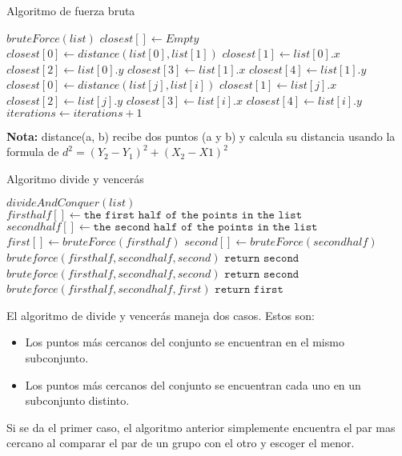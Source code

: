 \begin{algorithm}[h!]
\caption{Algoritmo de fuerza bruta}
\begin{algorithmic}
\State $bruteForce(list)$
    \State $closest[] \gets Empty$
    \State $closest[0] \gets distance(list[0], list[1])$
    \State $closest[1] \gets list[0].x$
    \State $closest[2] \gets list[0].y$
    \State $closest[3] \gets list[1].x$
    \State $closest[4] \gets list[1].y$
            \State $closest[0] \gets distance(list[j], list[i])$
            \State $ closest[1] \gets list[j].x$
            \State $ closest[2] \gets list[j].y$
            \State $ closest[3] \gets list[i].x$
            \State $ closest[4] \gets list[i].y$
        \EndIf
        \EndFor
        \State $ iterations \gets iterations + 1$
    \EndFor
\end{algorithmic}    
\end{algorithm}
\textbf{Nota:} distance(a, b) recibe dos puntos (a y b) y calcula su distancia usando la formula de $d^2 =(Y_2-Y_1)^2+(X_2-X1)^2$\\
\begin{algorithm}[h!]
\caption{Algoritmo divide y vencerás}
\begin{algorithmic}
\State $divideAndConquer(list)$
    \State $ firsthalf[] \gets \texttt{the first half of the points in the list}$
    \State $ secondhalf[] \gets \texttt{the second half of the points in the list}$
    \State $ first[] \gets bruteForce(firsthalf)$
    \State $ second[] \gets bruteForce(secondhalf)$
        \State $bruteforce(firsthalf, secondhalf,second)$
        \State $\texttt{return second}$
    \Else
            \State $bruteforce(firsthalf, secondhalf,second)$
            \State $\texttt{return second}$
        \Else
            \State $bruteforce(firsthalf, secondhalf,first)$
            \State $\texttt{return first}$
         \EndIf
    \EndIf
\end{algorithmic}    
\end{algorithm}
\FloatBarrier
El algoritmo de divide y vencerás maneja dos casos. Estos son:
\begin{itemize}
    \item 
    Los puntos más cercanos del conjunto se encuentran en el mismo subconjunto.
    \item
    Los puntos más cercanos del conjunto se encuentran cada uno en un subconjunto distinto.
\end{itemize}
Si se da el primer caso, el algoritmo anterior simplemente encuentra el par mas cercano al comparar el par de un grupo con el otro y escoger el menor.\\

